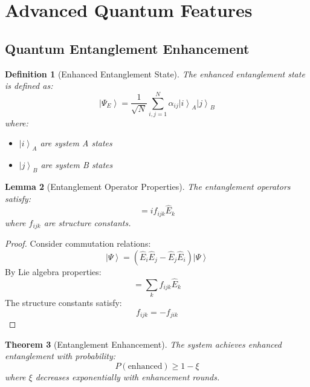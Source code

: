 \documentclass[12pt]{article}
\newcommand{\ket}[1]{\left|#1\right\rangle}
\newcommand{\op}[1]{\hat{#1}}
\newtheorem{theorem}{Theorem}[section]
\newtheorem{lemma}[theorem]{Lemma}
\newtheorem{definition}[theorem]{Definition}
\begin{document}
\section{Advanced Quantum Features}
\subsection{Quantum Entanglement Enhancement}
\begin{definition}[Enhanced Entanglement State]
The enhanced entanglement state is defined as:
\begin{equation}
\ket{\Psi_E} = \frac{1}{\sqrt{N}}\sum_{i,j=1}^N \alpha_{ij}\ket{i}_A\ket{j}_B
\end{equation}
where:
\begin{itemize}
\item $\ket{i}_A$ are system A states
\item $\ket{j}_B$ are system B states
\end{itemize}
\end{definition}
\begin{lemma}[Entanglement Operator Properties]
The entanglement operators satisfy:
\begin{equation}
[\op{E}_i,\op{E}_j] = if_{ijk}\op{E}_k
\end{equation}
where $f_{ijk}$ are structure constants.
\end{lemma}
\begin{proof}
Consider commutation relations:
\begin{equation}
[\op{E}_i,\op{E}_j]\ket{\Psi} = (\op{E}_i\op{E}_j - \op{E}_j\op{E}_i)\ket{\Psi}
\end{equation}
By Lie algebra properties:
\begin{equation}
[\op{E}_i,\op{E}_j] = \sum_k f_{ijk}\op{E}_k
\end{equation}
The structure constants satisfy:
\begin{equation}
f_{ijk} = -f_{jik}
\end{equation}
\end{proof}
\begin{theorem}[Entanglement Enhancement]
The system achieves enhanced entanglement with probability:
\begin{equation}
P(\text{enhanced}) \geq 1 - \xi
\end{equation}
where $\xi$ decreases exponentially with enhancement rounds.
\end{theorem}
\end{document}
